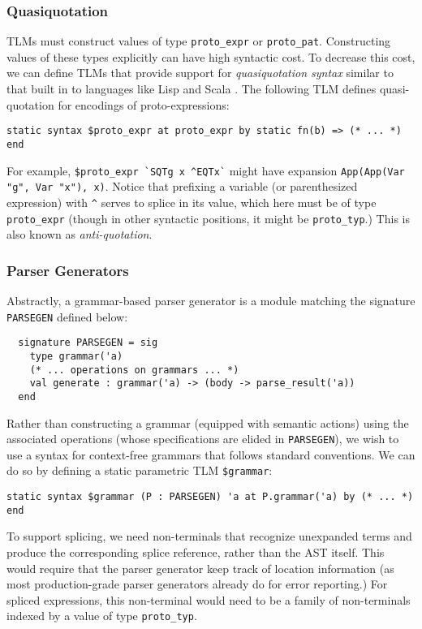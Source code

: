 \documentclass[acmsmall,10pt,review,anonymous]{acmart}\settopmatter{printfolios=true}
\newcommand{\li}[1]{\lstinline{#1}}
\begin{document}
\subsubsection{Quasiquotation}
TLMs must construct values of type \li{proto_expr} or \li{proto_pat}. Constructing values of these types explicitly can have high syntactic cost. To decrease this cost, we can define TLMs that provide support for \emph{quasiquotation syntax} similar to that built in to languages like Lisp \cite{Bawd99a} and Scala \cite{shabalin2013quasiquotes}. The following TLM defines quasi-quotation for encodings of proto-expressions:
\begin{lstlisting}[numbers=none]
  static syntax $proto_expr at proto_expr by static fn(b) => (* ... *) end
\end{lstlisting}
For example, \li{$proto_expr `SQTg x ^EQTx`} might have expansion \li{App(App(Var "g", Var "x"), x)}. Notice that prefixing a variable (or parenthesized expression) with \li{^} serves to splice in its value, which here must be of type \li{proto_expr} (though in other syntactic positions, it might be \li{proto_typ}.) This is also known as \emph{anti-quotation}.


\subsubsection{Parser Generators}
Abstractly, a grammar-based parser generator is a module matching the signature \li{PARSEGEN} defined below:
\begin{lstlisting}
  signature PARSEGEN = sig 
    type grammar('a)
    (* ... operations on grammars ... *)
    val generate : grammar('a) -> (body -> parse_result('a))
  end
\end{lstlisting}

Rather than constructing a grammar (equipped with semantic actions) using the associated operations (whose specifications are elided in \li{PARSEGEN}), we wish to use a syntax for context-free grammars that follows standard conventions. We can do so by defining a static parametric TLM \li{$grammar}:
\begin{lstlisting}[numbers=none]
  static syntax $grammar (P : PARSEGEN) 'a at P.grammar('a) by (* ... *) end
\end{lstlisting}
To support splicing, we need non-terminals that recognize unexpanded terms and produce the corresponding splice reference, rather than the AST itself. This would require that the parser generator keep track of location information (as most production-grade parser generators already do for error reporting.) For spliced expressions, this non-terminal would need to be a family of non-terminals indexed by a value of type \li{proto_typ}. 
\end{document}

